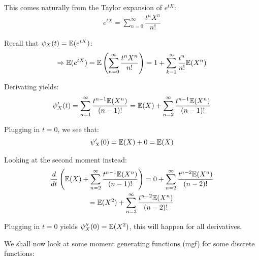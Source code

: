 \begin{prf}[]{}
  This comes naturally from the Taylor expansion of $e^{tX}$:
  \begin{equation*}
    \begin{gathered}
      e^{tX} = \sum_{n=0}^{\infty}\dfrac{t^n X^n}{n!}
    \end{gathered}
  \end{equation*}
  \par\bigskip
  \noindent Recall that $\psi_X(t) = \mathbb{E}(e^{tX})$:
  \begin{equation*}
    \begin{gathered}
      \Rightarrow \mathbb{E}(e^{tX}) = \mathbb{E}\left(\sum_{n=0}^{\infty}\dfrac{t^n X^n}{n!}\right) = 1+\sum_{k=1}^{\infty}\dfrac{t^n}{n!}\mathbb{E}(X^n)
    \end{gathered}
  \end{equation*}\par
  \noindent Derivating yields:
  \begin{equation*}
    \begin{gathered}
      \psi_X^{\prime}(t) = \sum_{n=1}^{\infty}\dfrac{t^{n-1}\mathbb{E}(X^n)}{(n-1)!} = \mathbb{E}(X)+\sum_{n=2}^{\infty}\dfrac{t^{n-1}\mathbb{E}(X^n)}{(n-1)!}
    \end{gathered}
  \end{equation*}\par
  \noindent Plugging in $t=0$, we see that:
  \begin{equation*}
    \begin{gathered}
      \psi_X^{\prime}(0) = \mathbb{E}(X) + 0 = \mathbb{E}(X)
    \end{gathered}
  \end{equation*}
  \par\bigskip
  \noindent Looking at the second moment instead:
  \begin{equation*}
    \begin{gathered}
      \dfrac{d}{dt}\left(\mathbb{E}(X)+\sum_{n=2}^{\infty}\dfrac{t^{n-1}\mathbb{E}(X^n)}{(n-1)!}\right) = 0+\sum_{n=2}^{\infty}\dfrac{t^{n-2}\mathbb{E}(X^n)}{(n-2)!}\\
      = \mathbb{E}(X^2)+\sum_{n=3}^{\infty}\dfrac{t^{n-2}\mathbb{E}(X^n)}{(n-2)!}
    \end{gathered}
  \end{equation*}\par
  \noindent Plugging in $t=0$ yields $\psi_X^{\prime\prime}(0) = \mathbb{E}(X^2)$, this will happen for all derivatives.
\end{prf}
\par\bigskip
\noindent We shall now look at some moment generating functions (mgf) for some discrete functions:\par
